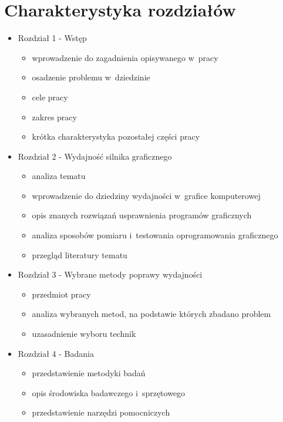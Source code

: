 \documentclass[a4paper,twoside,12pt]{book}
\begin{document}
\section{Charakterystyka rozdziałów}
\begin{itemize}
    \item Rozdział 1 - Wstęp \\
    \begin{itemize}
        \item wprowadzenie do zagadnienia opisywanego w~pracy
        \item osadzenie problemu w~dziedzinie
        \item cele pracy
        \item zakres pracy
        \item krótka charakterystyka pozostałej części pracy
    \end{itemize}
    \item Rozdział 2 - Wydajność silnika graficznego \\
    \begin{itemize}
        \item analiza tematu
        \item wprowadzenie do dziedziny wydajności w~grafice komputerowej
        \item opis znanych rozwiązań usprawnienia programów graficznych
        \item analiza sposobów pomiaru i~testowania oprogramowania graficznego
        \item przegląd literatury tematu
    \end{itemize}
    \item Rozdział 3 - Wybrane metody poprawy wydajności \\
    \begin{itemize}
        \item przedmiot pracy
        \item analiza wybranych metod, na podstawie których zbadano problem
        \item uzasadnienie wyboru technik
    \end{itemize}
    \item Rozdział 4 - Badania \\
    \begin{itemize}
        \item przedstawienie metodyki badań
        \item opis środowiska badawczego i~sprzętowego
        \item przedstawienie narzędzi pomocniczych

\end{itemize}
\end{itemize}
\end{document}
